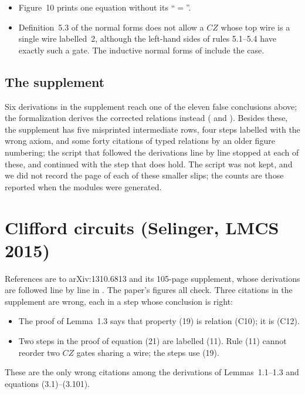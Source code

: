 \documentclass[11pt]{article}
\begin{document}
\begin{itemize}
\item Figure~10 prints one equation without its ``$=$''.
\item Definition~5.3 of the normal forms does not allow a $CZ$ whose
  top wire is a single wire labelled~2, although the left-hand sides
  of rules 5.1--5.4 have exactly such a gate. The inductive normal
  forms of  include the case.
\end{itemize}

\subsection{The supplement}

Six derivations in the supplement reach one of the eleven false
conclusions above; the formalization derives the corrected relations
instead ( and
). Besides these, the supplement has five misprinted
intermediate rows, four steps labelled with the wrong axiom, and some
forty citations of typed relations by an older figure numbering; the
script that followed the derivations line by line stopped at each of
these, and continued with the step that does hold. The script was not
kept, and we did not record the page of each of these smaller slips;
the counts are those reported when the modules were generated.

\section{Clifford circuits (Selinger, LMCS 2015)}

References are to arXiv:1310.6813 and its 105-page supplement, whose
derivations are followed line by line in
. The paper's figures all check.
Three citations in the supplement are wrong, each in a step whose
conclusion is right:

\begin{itemize}
\item The proof of Lemma~1.3 says that property (19) is relation
  (C10); it is (C12).
\item Two steps in the proof of equation (21) are labelled (11). Rule
  (11) cannot reorder two $CZ$ gates sharing a wire; the steps use
  (19).
\end{itemize}

These are the only wrong citations among the derivations of
Lemmas~1.1--1.3 and equations (3.1)--(3.101).
\end{document}
